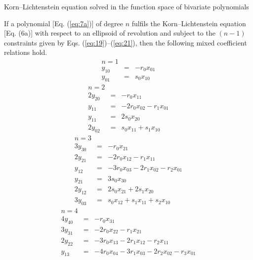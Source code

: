 \documentclass[jog]{svjour}
\begin{document}
\begin{corollary}\label{cor:2}
Korn--Lichtenstein equation solved in the function space of bivariate
polynomials

If a polynomial [Eq. (\ref{eq:7a})] of degree $n$ fulfils the
Korn--Lichtenstein equation [Eq. (6a)] with respect to an ellipsoid of
revolution and subject to the $(n-1)$ constraints given by Eqs.
(\ref{eq:19})--(\ref{eq:21}), then the following mixed coefficient
relations hold.
\begin{equation}
\begin{array}{rcl}
{n=1} & & \\ [5pt]
y_{10} & = &-r_0x_{01}\\
y_{01} & = &s_0x_{10}
\end{array}
\label{eq:26}
\end{equation}
\begin{equation}
\begin{array}{rcl}
{n=2} & &\\ [5pt]
2y_{20} & = &-r_0x_{11}\\
y_{11} & = &-2r_0x_{02}-r_1x_{01}\\
y_{11} & = &2s_0x_{20}\\
2y_{02} & = &s_0x_{11}+s_1x_{10}
\end{array}
\label{eq:27}
\end{equation}
\begin{equation}
\begin{array}{rcl}
{n=3} & &\\ [5pt]
3y_{30} & = &-r_0x_{21}\\
2y_{21} & = &-2r_0x_{12}-r_1x_{11}\\
y_{12} & = &-3r_0x_{03}-2r_1x_{02}-r_2x_{01}\\
y_{21} & = &3s_0x_{30}\\
2y_{12} & = &2s_0x_{21}+2s_1x_{20}\\
3y_{03} & = &s_0x_{12}+s_1x_{11}+s_2x_{10}
\end{array}
\label{eq:28}
\end{equation}
\begin{equation}
\begin{array}{rcl}
{n=4} & &\\ [5pt]
4y_{40} & = & -r_0x_{31}\\
3y_{31} & = & -2r_0x_{22}-r_1x_{21}\\
2y_{22} & = & -3r_0x_{13}-2r_1x_{12}-r_2x_{11}\\
y_{13} & = & -4r_0x_{04}-3r_1x_{03}-2r_2x_{02}-r_3x_{01}\\

\end{array}
\end{equation}
\end{corollary}
\end{document}
